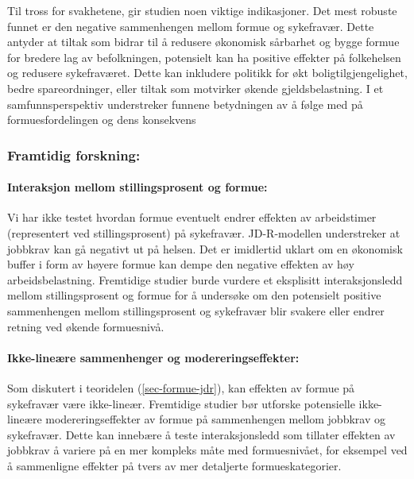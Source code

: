 \documentclass[
  12pt,
  a4paper,
  DIV=11,
  numbers=noendperiod]{scrartcl}
\let\oldparagraph\paragraph
\renewcommand{\paragraph}[1]{\oldparagraph{#1}\mbox{}}
\begin{document}
Til tross for svakhetene, gir studien noen viktige indikasjoner. Det
mest robuste funnet er den negative sammenhengen mellom formue og
sykefravær. Dette antyder at tiltak som bidrar til å redusere økonomisk
sårbarhet og bygge formue for bredere lag av befolkningen, potensielt
kan ha positive effekter på folkehelsen og redusere sykefraværet. Dette
kan inkludere politikk for økt boligtilgjengelighet, bedre
spareordninger, eller tiltak som motvirker økende gjeldsbelastning. I et
samfunnsperspektiv understreker funnene betydningen av å følge med på
formuesfordelingen og dens konsekvens

\subsubsection{Framtidig forskning:}\label{framtidig-forskning}

\paragraph{Interaksjon mellom stillingsprosent og
formue:}\label{interaksjon-mellom-stillingsprosent-og-formue}

Vi har ikke testet hvordan formue eventuelt endrer effekten av
arbeidstimer (representert ved stillingsprosent) på sykefravær.
JD-R-modellen understreker at jobbkrav kan gå negativt ut på helsen. Det
er imidlertid uklart om en økonomisk buffer i form av høyere formue kan
dempe den negative effekten av høy arbeidsbelastning. Fremtidige studier
burde vurdere et eksplisitt interaksjonsledd mellom stillingsprosent og
formue for å undersøke om den potensielt positive sammenhengen mellom
stillingsprosent og sykefravær blir svakere eller endrer retning ved
økende formuesnivå.

\paragraph{Ikke-lineære sammenhenger og
modereringseffekter:}\label{ikke-lineuxe6re-sammenhenger-og-modereringseffekter}

Som diskutert i teoridelen (\autoref{sec-formue-jdr}), kan effekten av
formue på sykefravær være ikke-lineær. Fremtidige studier bør utforske
potensielle ikke-lineære modereringseffekter av formue på sammenhengen
mellom jobbkrav og sykefravær. Dette kan innebære å teste
interaksjonsledd som tillater effekten av jobbkrav å variere på en mer
kompleks måte med formuesnivået, for eksempel ved å sammenligne effekter
på tvers av mer detaljerte formueskategorier.
\end{document}
